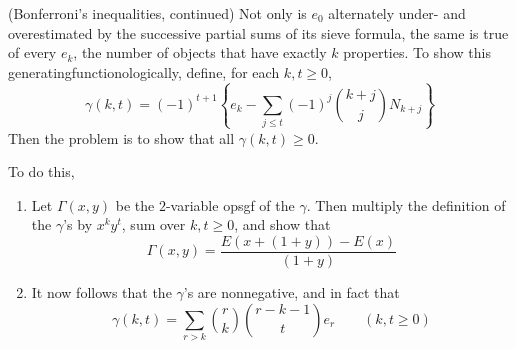 \begin{exercise}
    (Bonferroni's inequalities, continued) Not only is $e_0$ alternately under- and overestimated by the successive partial sums of its sieve formula, the same is true of every $e_k$, the number of objects that have exactly $k$ properties. To show this generatingfunctionologically, define, for each $k,t \geq 0$,
    \[
        \gamma(k,t) = (-1)^{t+1}\left\{e_k - \sum_{j\leq t}(-1)^j \binom{k+j}{j} N_{k+j}\right\}
    \]
    Then the problem is to show that all $\gamma(k,t)\geq 0$.

    To do this,
    \begin{enumerate}[label=(\alph*)]
        \item Let $\Gamma(x,y)$ be the $2$-variable opsgf of the $\gamma$. Then multiply the definition of the $\gamma$'s by $x^ky^t$, sum over $k,t\geq 0$, and show that
        \[
            \Gamma(x,y) = \frac{E(x+(1+y))-E(x)}{(1+y)}
        \]
        \item It now follows that the $\gamma$'s are nonnegative, and in fact that 
        \[
            \gamma(k,t) = \sum_{r > k}\binom{r}{k}\binom{r-k-1}{t}e_r \qquad (k,t\geq 0)
        \]
    \end{enumerate}
\end{exercise}
